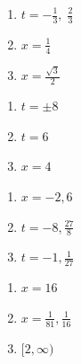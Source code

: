 \begin{multicols}{3}
\begin{enumerate}
\setcounter{enumi}{\value{HW}}


\item  $t = -\frac{1}{3}, \; \frac{2}{3}$  
\item $x = \frac{1}{4}$  
\item $x = \frac{\sqrt{3}}{2}$

\setcounter{HW}{\value{enumi}}
\end{enumerate}
\end{multicols}

\begin{multicols}{3}
\begin{enumerate}
\setcounter{enumi}{\value{HW}}


\item $t = \pm 8$
\item $t = 6$
\item  $x = 4$

\setcounter{HW}{\value{enumi}}
\end{enumerate}
\end{multicols}

\begin{multicols}{3}
\begin{enumerate}
\setcounter{enumi}{\value{HW}}
 
\item  $x=-2, 6$  
\item   $t=-8, \frac{27}{8}$
\item   $t=-1, \frac{1}{27}$   

\setcounter{HW}{\value{enumi}}
\end{enumerate}
\end{multicols}

\begin{multicols}{3}
\begin{enumerate}
\setcounter{enumi}{\value{HW}}

\item $x=16$ 
\item  $x = \frac{1}{81}, \frac{1}{16}$
\item  $[2, \infty)$   


\setcounter{HW}{\value{enumi}}
\end{enumerate}
\end{multicols}

